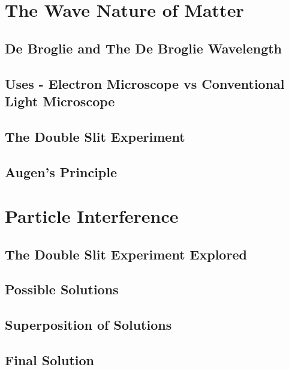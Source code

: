 \documentclass[colorlinks,11pt,a4paper,normalphoto,withhyper,ragged2e]{altareport}
\begin{document}
	
	\pagebreak
	
	
	
	
\section{The Wave Nature of Matter}
	
	\subsection{De Broglie and The De Broglie Wavelength}
	
	
	\subsection{Uses - Electron Microscope vs Conventional Light Microscope}
	
	
	\subsection{The Double Slit Experiment}
	
	
	\subsection{Augen’s Principle}
	
	
	\pagebreak
	
	
	
	
\section{Particle Interference}
	
	\subsection{The Double Slit Experiment Explored}
	
	
	\subsection{Possible Solutions}
	
	
	\subsection{Superposition of Solutions}
	
	
	\subsection{Final Solution}
	
\end{document}
